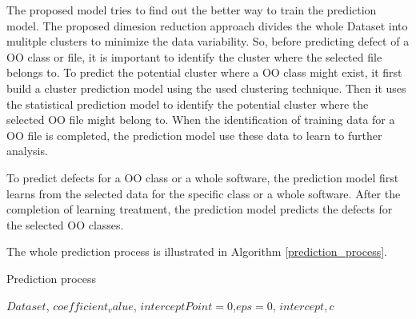 \documentclass[12pt]{report}
\begin{document}
The proposed model tries to find out the better way to train the prediction model. The proposed dimesion reduction approach divides the whole Dataset into mulitple clusters to minimize the data variability. So, before predicting defect of a OO class or file, it is important to identify the cluster where the selected file belongs to. To predict the potential cluster where a OO class might exist, it first build a cluster prediction model using the used clustering technique. Then it uses the statistical prediction model to identify the potential cluster where the selected OO file might belong to. When the identification of training data for a OO file is completed, the prediction model use these data to learn to further analysis.
%

To predict defects for a OO class or a whole software, the prediction model first learns from the selected data for the specific class or a whole software. After the completion of learning treatment, the prediction model predicts the defects for the selected OO classes.

The whole prediction process is illustrated in Algorithm \ref{prediction_process}.

\begin{algorithm}
	\caption{Prediction process}
	\label{prediction_process}
		\begin{algorithmic}[1]
			\REQUIRE  $ Dataset$, $coefficient_value$, $interceptPoint=0$,$eps=0$, $intercept, c$
			
			\ENDFOR
		\end{algorithmic}
	\end{algorithm}
\end{document}
